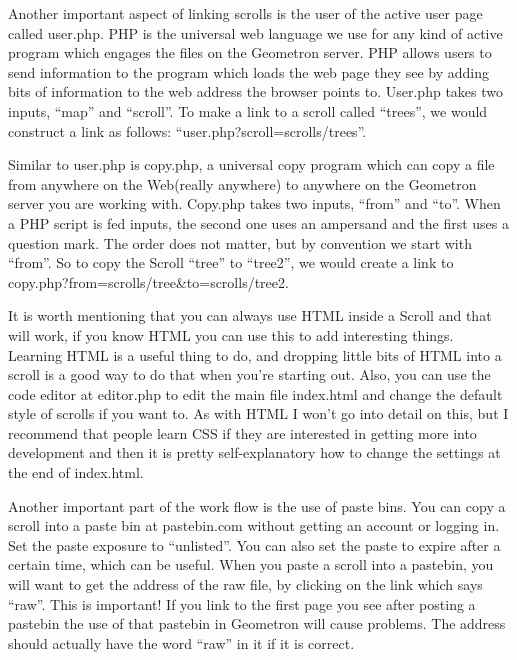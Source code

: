 Another important aspect of linking scrolls is the user of the active user page called user.php.  PHP is the universal web language we use for any kind of active program which engages the files on the Geometron server.  PHP allows users to send information to the program which loads the web page they see by adding bits of information to the web address the browser points to.  User.php takes two inputs, ``map'' and ``scroll''.  To make a link to a scroll called ``trees'', we would construct a link as follows: ``user.php?scroll=scrolls/trees''.  

Similar to user.php is copy.php, a universal copy program which can copy a file from anywhere on the Web(really anywhere) to anywhere on the Geometron server you are working with.  Copy.php takes two inputs, ``from'' and ``to''.  When a PHP script is fed inputs, the second one uses an ampersand and the first uses a question mark.  The order does not matter, but by convention we start with ``from''.  So to copy the Scroll ``tree'' to ``tree2'', we would create a link to copy.php?from=scrolls/tree\&to=scrolls/tree2.  

It is worth mentioning that you can always use HTML inside a Scroll and that will work, if you know HTML you can use this to add interesting things.  Learning HTML is a useful thing to do, and dropping little bits of HTML into a scroll is a good way to do that when you're starting out.  Also, you can use the code editor at editor.php to edit the main file index.html and change the default style of scrolls if you want to.  As with HTML I won't go into detail on this, but I recommend that people learn CSS if they are interested in getting more into development and then it is pretty self-explanatory how to change the settings at the end of index.html.

Another important part of the work flow is the use of paste bins.  You can copy a scroll into a paste bin at pastebin.com without getting an account or logging in. Set the paste exposure to ``unlisted''.  You can also set the paste to expire after a certain time, which can be useful.  When you paste a scroll into a pastebin, you will want to get the address of the raw file, by clicking on the link which says ``raw''.  This is important! If you link to the first page you see after posting a pastebin the use of that pastebin in Geometron will cause problems. The address should actually have the word ``raw'' in it if it is correct.

